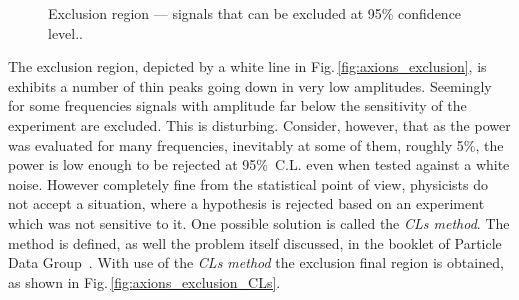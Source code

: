 \begin{figure}
  \myfloatalign
  \quad
  \caption{Exclusion region --- signals that can be excluded at 95\% confidence level..}
  \label{fig:axions_exclusions}
\end{figure}

The exclusion region, depicted by a white line in Fig.\,\ref{fig:axions_exclusion}, is exhibits a number of thin peaks going down in very low amplitudes. Seemingly for some frequencies signals with amplitude far below the sensitivity of the experiment are excluded. This is disturbing. Consider, however, that as the power was evaluated for many frequencies, inevitably at some of them, roughly 5\%, the power is low enough to be rejected at 95\%~C.L. even when tested against a white noise. However completely fine from the statistical point of view, physicists do not accept a situation, where a hypothesis is rejected based on an experiment which was not sensitive to it. One possible solution is called the \emph{CLs method}. The method is defined, as well the problem itself discussed, in the booklet of Particle Data Group~\citep{Group2014}. With use of the \emph{CLs method} the exclusion final region is obtained, as shown in Fig.\,\ref{fig:axions_exclusion_CLs}.
